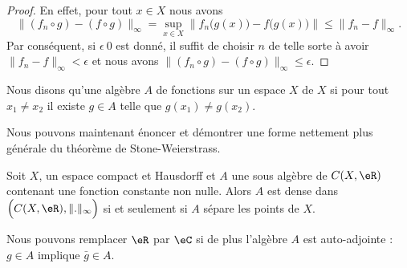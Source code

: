 \begin{proof}
    En effet, pour tout \( x\in X\) nous avons
    \begin{equation}
        \| (f_n\circ g)-(f\circ g) \|_{\infty}=\sup_{x\in X} \| f_n\big( g(x) \big)-f\big( g(x) \big) \|\leq \| f_n-f \|_{\infty}.
    \end{equation}
    Par conséquent, si \( \epsilon\>0\) est donné, il suffit de choisir \( n\) de telle sorte à avoir \( \| f_n-f \|_{\infty}<\epsilon\) et nous avons \( \| (f_n\circ g)-(f\circ g) \|_{\infty}\leq \epsilon\).
\end{proof}

\begin{definition}
    Nous disons qu'une algèbre \( A\) de fonctions sur un espace \( X\)  de \( X\) si pour tout \( x_1\neq x_2\) il existe \( g\in A\) telle que \( g(x_1)\neq g(x_2)\).
\end{definition}

Nous pouvons maintenant énoncer et démontrer une forme nettement plus générale du théorème de Stone-Weierstrass.
\begin{theorem}\label{ThoWmAzSMF}
    Soit \( X\), un espace compact et Hausdorff et \( A\) une sous algèbre de \( C(X,\eR)\) contenant une fonction constante non nulle. Alors \( A\) est dense dans \( \Big( C(X,\eR),\| . \|_{\infty}\Big)\) si et seulement si \( A\) sépare les points de \(X\).

    Nous pouvons remplacer \( \eR\) par \( \eC\) si de plus l'algèbre \( A\) est auto-adjointe : \( g\in A\) implique \( \bar g\in A\).
\end{theorem}


